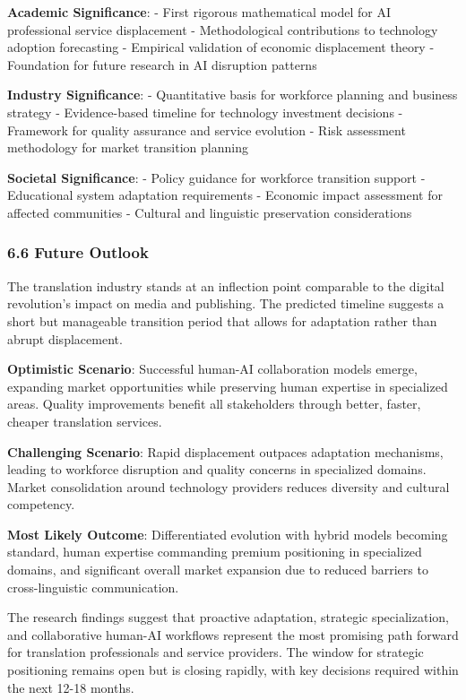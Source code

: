 \documentclass[12pt,a4paper]{article}
\begin{document}
{{{{{\textbf{Academic Significance}: - First rigorous mathematical model for
AI professional service displacement - Methodological contributions to
technology adoption forecasting - Empirical validation of economic
displacement theory - Foundation for future research in AI disruption
patterns

\textbf{Industry Significance}: - Quantitative basis for workforce
planning and business strategy - Evidence-based timeline for technology
investment decisions - Framework for quality assurance and service
evolution - Risk assessment methodology for market transition planning

\textbf{Societal Significance}: - Policy guidance for workforce
transition support - Educational system adaptation requirements -
Economic impact assessment for affected communities - Cultural and
linguistic preservation considerations

\hypertarget{future-outlook}{%
\subsubsection{6.6 Future Outlook}\label{future-outlook}}

The translation industry stands at an inflection point comparable to the
digital revolution's impact on media and publishing. The predicted
timeline suggests a short but manageable transition period that allows
for adaptation rather than abrupt displacement.

\textbf{Optimistic Scenario}: Successful human-AI collaboration models
emerge, expanding market opportunities while preserving human expertise
in specialized areas. Quality improvements benefit all stakeholders
through better, faster, cheaper translation services.

\textbf{Challenging Scenario}: Rapid displacement outpaces adaptation
mechanisms, leading to workforce disruption and quality concerns in
specialized domains. Market consolidation around technology providers
reduces diversity and cultural competency.

\textbf{Most Likely Outcome}: Differentiated evolution with hybrid
models becoming standard, human expertise commanding premium positioning
in specialized domains, and significant overall market expansion due to
reduced barriers to cross-linguistic communication.

The research findings suggest that proactive adaptation, strategic
specialization, and collaborative human-AI workflows represent the most
promising path forward for translation professionals and service
providers. The window for strategic positioning remains open but is
closing rapidly, with key decisions required within the next 12-18
months.

}}}}}
\end{document}
